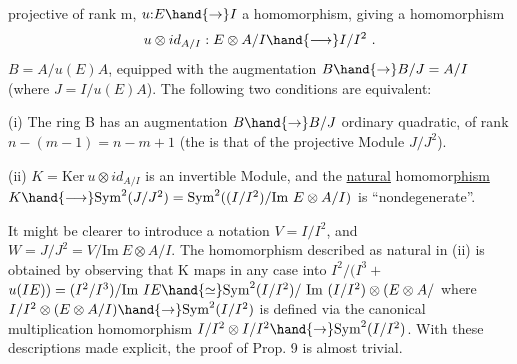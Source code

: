 
projective of rank m, $u{:}E \hand{\to} I$ a homomorphism, giving a homomorphism
\[ u\otimes id_{A/I} : E\otimes A/I \hand{\longrightarrow} I/I^2 \ . \]
  $B = A/u(E)A$, equipped with the augmentation $B\hand{\to} B/J = A/I$
(where $J = I/u(E)A$). The following two conditions are equivalent:

 (i) The  ring B  has an augmentation $B\hand{\to} B/J$  ordinary
quadratic, of rank $n-(m-1)= n-m+1$ (the 
is  that of the projective Module $J/J^2$).

 (ii) $K = \mathrm{Ker}\ u\otimes id_{A/I}$ is an invertible Module, and the
\uline{natural} homomor\uline{phism} $K \hand{\longrightarrow} \mathrm{Sym}^2(J/J^2) = \mathrm{Sym}^2( (I/I^2)/\mathrm{Im}\ E\otimes A/I )$ is
``nondegenerate''.

It might be clearer to introduce a notation $V = I/I^2$,
and $W = J/J^2 = V / \mathrm{Im}\ E\otimes A/I$. The homomorphism described as natural
in (ii) is obtained by observing that K maps in any case into
 $I^2/(I^3 +$  $u(IE)) = (I^2/I^3)/\mathrm{Im}\ IE \hand{\simeq} \mathrm{Sym}^2(I/I^2)/\ \mathrm{Im}\ (I/I^2)\otimes(E\otimes A/$
where $I/I^2 \otimes(E \otimes A/I) \hand{\to} \mathrm{Sym}^2(I/I^2)$ is defined via the canonical
multiplication homomorphism $I/I^2 \otimes I/I^2 \hand{\to} \mathrm{Sym}^2(I/I^2 )$. With these descriptions
made explicit, the proof of Prop. 9 is almost trivial.

